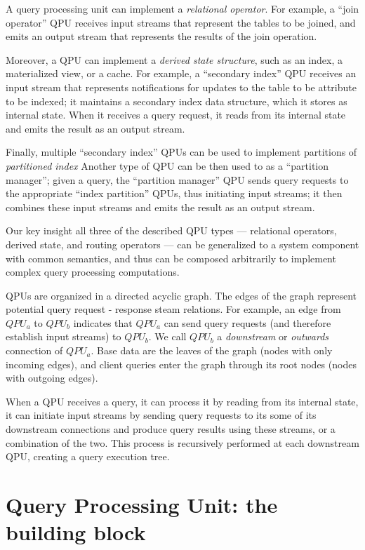 \medskip
\noindent
A query processing unit can implement a \textit{relational operator}.
For example, a ``join operator'' QPU receives input streams that represent the tables to be joined,
and emits an output stream that represents the results of the join operation.

Moreover, a QPU can implement a \textit{derived state structure}, such as an index, a materialized view, or a cache.
For example, a ``secondary index'' QPU receives an input stream that represents notifications for updates to the table
to be attribute to be indexed; it maintains a secondary index data structure, which it stores as internal state.
When it receives a query request, it reads from its internal state and emits the result as an output stream.

Finally, multiple ``secondary index'' QPUs can be used to implement partitions of \textit{partitioned index}
Another type of QPU can be then used to as a ``partition manager''; given a query, the ``partition manager'' QPU sends query
requests to the appropriate  ``index partition'' QPUs, thus initiating input streams; it then combines these input streams
and emits the result as an output stream.

Our key insight all three of the described QPU types --- relational operators, derived state, and routing operators ---
can be generalized to a system component with common semantics, and thus can be composed arbitrarily to implement complex
query processing computations.

\medskip
\noindent
QPUs are organized in a directed acyclic graph.
The edges of the graph represent potential query request - response steam relations.
For example, an edge from $QPU_a$ to $QPU_b$ indicates that $QPU_a$ can send query requests (and therefore establish input streams)
to $QPU_b$.
We call $QPU_b$ a \textit{downstream} or \textit{outwards} connection of $QPU_a$.
Base data are the leaves of the graph (nodes with only incoming edges),
and client queries enter the graph through its root nodes (nodes with outgoing edges).

When a QPU receives a query, it can process it by reading from its internal state, it can initiate input streams
by sending query requests to its some of its downstream connections and produce query results using these streams,
or a combination of the two.
This process is recursively performed at each downstream QPU, creating a query execution tree.

\section{Query Processing Unit: the building block}

